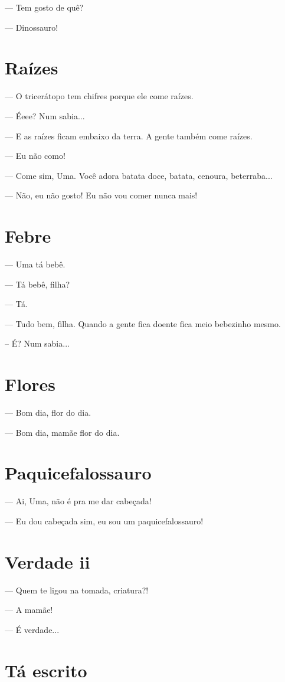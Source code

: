 {— Tem gosto de quê?

— Dinossauro!

\chapter{Raízes}

— O tricerátopo tem chifres porque ele come raízes.

— Éeee? Num sabia...

— E as raízes ficam embaixo da terra. A gente também come raízes.

— Eu não como!

— Come sim, Uma. Você adora batata doce, batata, cenoura, beterraba...

— Não, eu não gosto! Eu não vou comer nunca mais!

\chapter{Febre}

— Uma tá bebê.

— Tá bebê, filha?

— Tá.

— Tudo bem, filha. Quando a gente fica doente fica meio bebezinho mesmo.

-- É? Num sabia...

\chapter{Flores}

— Bom dia, flor do dia.

— Bom dia, mamãe flor do dia.

\chapter{Paquicefalossauro}

— Ai, Uma, não é pra me dar cabeçada!

— Eu dou cabeçada sim, eu sou um paquicefalossauro!

\chapter{Verdade ii}

— Quem te ligou na tomada, criatura?!

— A mamãe!

— É verdade...

\chapter{Tá escrito}

}

